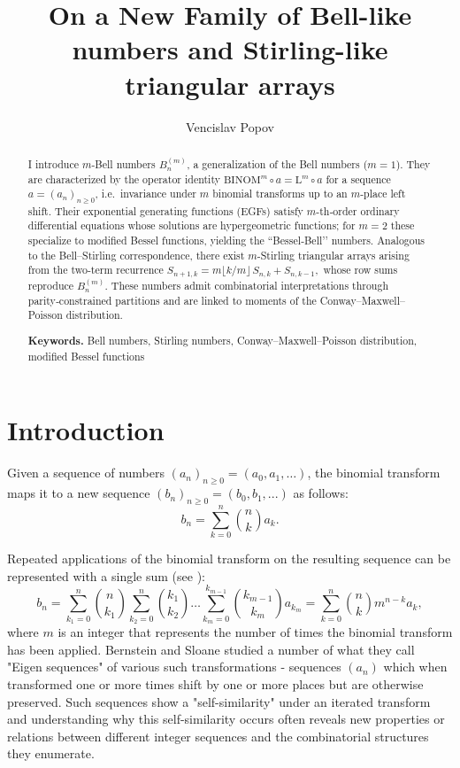 \documentclass[a4paper]{amsart}
\title{On a New Family of Bell-like numbers and Stirling-like triangular arrays}
\author{Vencislav Popov}
\date{}
\begin{document}
\begin{abstract}
I introduce $m$-Bell numbers $B^{(m)}_{n}$, a generalization of the Bell numbers ($m=1$). They are characterized by the operator identity $\mathrm{BINOM}^{m}\!\circ a=\mathrm{L}^{m}\!\circ a$ for a sequence $a=(a_{n})_{n\ge0}$, i.e.\ invariance under $m$ binomial transforms up to an $m$-place left shift.  Their exponential generating functions (EGFs) satisfy $m$-th‑order ordinary differential equations whose solutions are hypergeometric functions; for $m=2$ these specialize to modified Bessel functions, yielding the “Bessel‑Bell’’ numbers. Analogous to the Bell–Stirling correspondence, there exist \(m\)-Stirling triangular arrays arising from the two‑term recurrence  $S_{n+1,k}=m\!\lfloor k/m\rfloor\,S_{n,k}+S_{n,k-1},$ whose row sums reproduce $B^{(m)}_{n}$. These numbers admit combinatorial interpretations through parity‑constrained partitions and are linked to moments of the Conway–Maxwell–Poisson distribution.

\bigskip
\noindent\textbf{Keywords.} Bell numbers, Stirling numbers, Conway–Maxwell–Poisson distribution, modified Bessel functions
\end{abstract}

\maketitle

\section{Introduction}\label{sec-introduction}
\noindent Given a sequence of numbers $(a_n)_{n \geq 0} = (a_0, a_1, \ldots)$, the binomial transform maps it to a new sequence $(b_n)_{n \geq 0} = (b_0,b_1,...)$ as follows:
\begin{equation*}
    b_n = \sum_{k=0}^{n} \binom{n}{k} a_k.
\end{equation*}

Repeated applications of the binomial transform on the resulting sequence can be represented with a single sum (see \cite{spiveyKbinomialTransformsHankel2006}):
\begin{equation*}
    b_n = \sum_{k_1=0}^{n} \binom{n}{k_1}\sum_{k_2=0}^{n} \binom{k_1}{k_2} \dots \sum_{k_{m}=0}^{k_{m-1}} \binom{k_{m-1}}{k_m} a_{k_m} = \sum_{k=0}^{n} \binom{n}{k} m^{n-k} a_k,
\end{equation*}
where $m$ is an integer that represents the number of times the binomial transform has been applied. Bernstein and Sloane \cite{bernstein1995} studied a number of what they call "Eigen sequences" of various such transformations - sequences $(a_n)$ which when transformed one or more times shift by one or more places but are otherwise preserved. Such sequences show a "self-similarity" under an iterated transform and understanding why this self-similarity occurs often reveals new properties or relations between different integer sequences and the combinatorial structures they enumerate.
\end{document}
